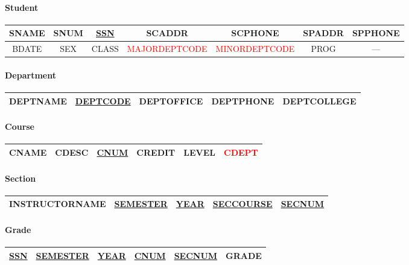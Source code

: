 \documentclass[12pt]{article}
\begin{document}
			\paragraph{Student\\}
				\footnotesize{
					\begin{tabular}{| c | c | c | c | c | c | c |}
						\hline
						SNAME & SNUM & \underline{SSN} & SCADDR & SCPHONE & SPADDR & SPPHONE\\
						\hline
						BDATE & SEX & CLASS & \textcolor{red}{MAJORDEPTCODE} & \textcolor{red}{MINORDEPTCODE} & PROG & ---\\
						\hline
					\end{tabular}
				}

			\paragraph{Department\\}
				\footnotesize{
					\begin{tabular}{| c | c | c | c | c |}
						\hline
						DEPTNAME & \underline{DEPTCODE} & DEPTOFFICE & DEPTPHONE & DEPTCOLLEGE\\
						\hline
					\end{tabular}
				}

			\paragraph{Course\\}
				\footnotesize{
					\begin{tabular}{| c | c | c | c | c | c |}
						\hline
						CNAME & CDESC & \underline{CNUM} & CREDIT & LEVEL & \textcolor{red}{CDEPT}\\
						\hline
					\end{tabular}
				}

			\paragraph{Section\\}
				\footnotesize{
					\begin{tabular}{| c | c | c | c | c |}
						\hline
						INSTRUCTORNAME & \underline{SEMESTER} & \underline{YEAR} & \underline{SECCOURSE} & \underline{SECNUM}\\
						\hline
					\end{tabular}
				}

			\paragraph{Grade\\}
				\footnotesize{
					\begin{tabular}{| c | c | c | c | c | c |}
						\hline
						\underline{SSN} & \underline{SEMESTER} & \underline{YEAR} & \underline{CNUM} & \underline{SECNUM} & GRADE\\
						\hline
					\end{tabular}
				}
\end{document}
